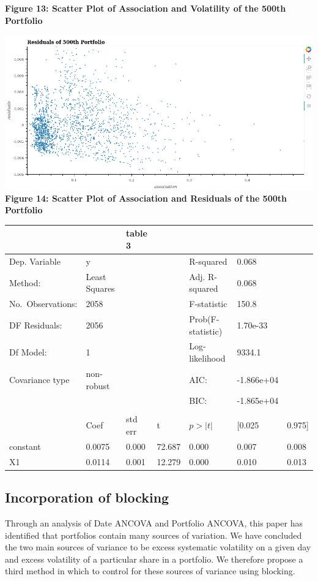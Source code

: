 \documentclass[11pt]{article}
\makeatletter
\def\maxwidth{\ifdim\Gin@nat@width>\linewidth\linewidth
    \else\Gin@nat@width\fi}
\let\Oldincludegraphics\includegraphics
\renewcommand{\includegraphics}[1]{\Oldincludegraphics[width=.8\maxwidth]{#1}}
\makeatother
\begin{document}
\textbf{Figure 13: Scatter Plot of Association and Volatility of the
500th Portfolio}

\includegraphics{../experiments/media/Scatter Plot of Residuals of 500th Portofolio.png}\\

\textbf{Figure 14: Scatter Plot of Association and Residuals of the
500th Portfolio}

\begin{longtable}[]{@{}lllllll@{}}
\toprule
& & table 3 & & & &\tabularnewline
\midrule
\endhead
Dep. Variable & y & & & R-squared & 0.068 &\tabularnewline
Method: & Least Squares & & & Adj. R-squared & 0.068 &\tabularnewline
No.~Observations: & 2058 & & & F-statistic & 150.8 &\tabularnewline
DF Residuals: & 2056 & & & Prob(F-statistic) & 1.70e-33 &\tabularnewline
Df Model: & 1 & & & Log-likelihood & 9334.1 &\tabularnewline
Covariance type & non-robust & & & AIC: & -1.866e+04 &\tabularnewline
& & & & BIC: & -1.865e+04 &\tabularnewline
& & & & & &\tabularnewline
& Coef & std err & t & \(p>|t|\) & {[}0.025 & 0.975{]}\tabularnewline
constant & 0.0075 & 0.000 & 72.687 & 0.000 & 0.007 &
0.008\tabularnewline
X1 & 0.0114 & 0.001 & 12.279 & 0.000 & 0.010 & 0.013\tabularnewline
\bottomrule
\end{longtable}

\hypertarget{incorporation-of-blocking}{%
\subsection{Incorporation of blocking}\label{incorporation-of-blocking}}

Through an analysis of Date ANCOVA and Portfolio ANCOVA, this paper has
identified that portfolios contain many sources of variation. We have
concluded the two main sources of variance to be excess systematic
volatility on a given day and excess volatility of a particular share in
a portfolio. We therefore propose a third method in which to control for
these sources of variance using blocking.
\end{document}
